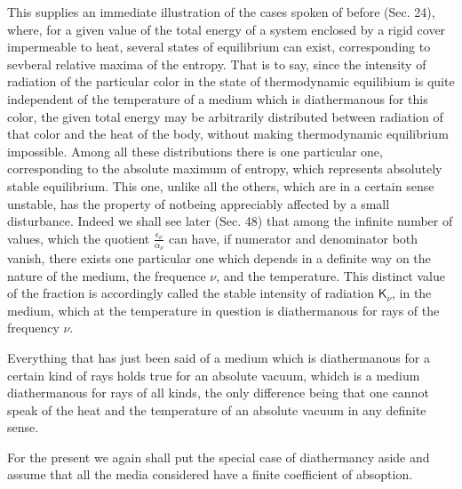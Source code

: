 \documentclass[12pt,oneside]{book}
\begin{document}
This supplies an immediate illustration of the cases spoken of before (Sec. 24), where, for a given value of the total energy of a system enclosed by a rigid cover impermeable to heat, several states of equilibrium can exist, corresponding to sevberal relative maxima of the entropy. That is to say, since the intensity of radiation of the particular color in the state of thermodynamic equilibium is quite independent of the temperature of a medium which is diathermanous for this color, the given total energy may be arbitrarily distributed between radiation of that color and the heat of the body, without making thermodynamic equilibrium impossible. Among all these distributions there is one particular one, corresponding to the absolute maximum of entropy, which represents absolutely stable equilibrium. This one, unlike all the others, which are in a certain sense unstable, has the property of notbeing appreciably affected by a small disturbance. Indeed we shall see later (Sec. 48) that among the infinite number of values, which the quotient $\frac{\epsilon_\nu}{\alpha_\nu}$ can have, if numerator and denominator both vanish, there exists one particular one which depends in a definite way on the nature of the medium, the frequence $\nu$, and the temperature. This distinct value of the fraction is accordingly called the stable intensity of radiation $\mathsf{K}_\nu$, in the medium, which at the temperature in question is diathermanous for rays of the frequency $\nu$. \par

Everything that has just been said of a medium which is diathermanous for a certain kind of rays holds true for an absolute vacuum, whidch is a medium diathermanous for rays of all kinds, the only difference being that one cannot speak of the heat and the temperature of an absolute vacuum in any definite sense. \par

For the present we again shall put the special case of diathermancy aside and assume that all the media considered have a finite coefficient of absoption. \par
\end{document}

